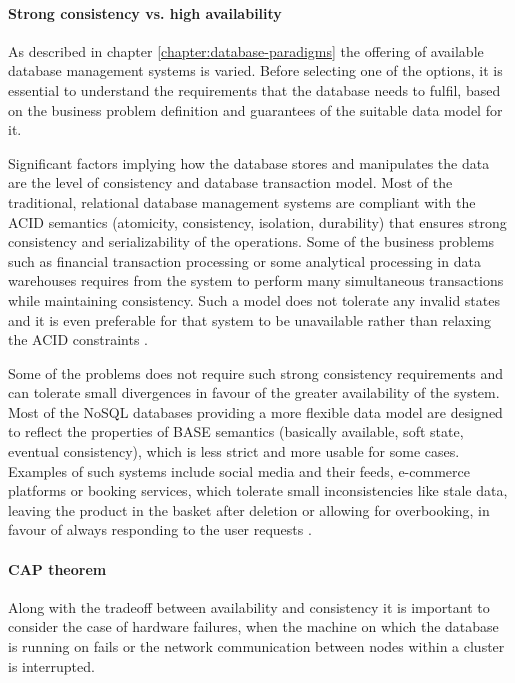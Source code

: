 \paragraph*{Strong consistency vs. high availability}

As described in chapter \ref{chapter:database-paradigms} the offering of available database management systems is varied. Before selecting one of the options, it is essential to understand the requirements that the database needs to fulfil, based on the business problem definition and guarantees of the suitable data model for it. 

Significant factors implying how the database stores and manipulates the data are the level of consistency and database transaction model. Most of the traditional, relational database management systems are compliant with the ACID semantics (atomicity, consistency, isolation, durability) that ensures strong consistency and serializability of the operations. Some of the business problems such as financial transaction processing or some analytical processing in data warehouses requires from the system to perform many simultaneous transactions while maintaining consistency. Such a model does not tolerate any invalid states and it is even preferable for that system to be unavailable rather than relaxing the ACID constraints \cite{PerspectivesOnArchitectureEvolution}.

Some of the problems does not require such strong consistency requirements and can tolerate small divergences in favour of the greater availability of the system. Most of the NoSQL databases providing a more flexible data model are designed to reflect the properties of BASE semantics (basically available, soft state, eventual consistency), which is less strict and more usable for some cases. Examples of such systems include social media and their feeds, e-commerce platforms or booking services, which tolerate small inconsistencies like stale data, leaving the product in the basket after deletion or allowing for overbooking, in favour of always responding to the user requests \cite{NoSQLDatabaseSystemsSurveyDecisionGuidance}.

\paragraph*{CAP theorem}

Along with the tradeoff between availability and consistency it is important to consider the case of hardware failures, when the machine on which the database is running on fails or the network communication between nodes within a cluster is interrupted. 


